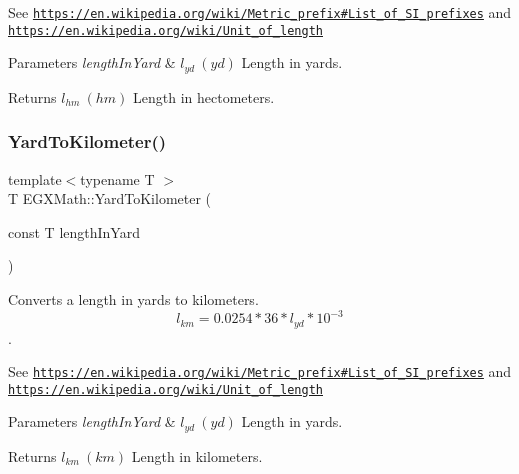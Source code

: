 See \href{https://en.wikipedia.org/wiki/Metric_prefix#List_of_SI_prefixes}{\tt https\+://en.\+wikipedia.\+org/wiki/\+Metric\+\_\+prefix\#\+List\+\_\+of\+\_\+\+S\+I\+\_\+prefixes} and \href{https://en.wikipedia.org/wiki/Unit_of_length}{\tt https\+://en.\+wikipedia.\+org/wiki/\+Unit\+\_\+of\+\_\+length} 
\begin{DoxyParams}{Parameters}
{\em length\+In\+Yard} & $ l_{yd}\ (yd)$ Length in yards. \\
\hline
\end{DoxyParams}
\begin{DoxyReturn}{Returns}
$ l_{hm}\ (hm)$ Length in hectometers. 
\end{DoxyReturn}
\mbox{\label{group___e_g_x_math-_conversions-_length_conversions-_imperial-_yard-_s_i_ga035659a5d1e693eaeda9b012fe59a44f}} 
\subsubsection{\texorpdfstring{Yard\+To\+Kilometer()}{YardToKilometer()}}
{\footnotesize\ttfamily template$<$typename T $>$ \\
T E\+G\+X\+Math\+::\+Yard\+To\+Kilometer (\begin{DoxyParamCaption}\item[{const T}]{length\+In\+Yard }\end{DoxyParamCaption})}



Converts a length in yards to kilometers. \[ l_{km}=0.0254 * 36 * l_{yd} * 10^{-3} \]. 

See \href{https://en.wikipedia.org/wiki/Metric_prefix#List_of_SI_prefixes}{\tt https\+://en.\+wikipedia.\+org/wiki/\+Metric\+\_\+prefix\#\+List\+\_\+of\+\_\+\+S\+I\+\_\+prefixes} and \href{https://en.wikipedia.org/wiki/Unit_of_length}{\tt https\+://en.\+wikipedia.\+org/wiki/\+Unit\+\_\+of\+\_\+length} 
\begin{DoxyParams}{Parameters}
{\em length\+In\+Yard} & $ l_{yd}\ (yd)$ Length in yards. \\
\hline
\end{DoxyParams}
\begin{DoxyReturn}{Returns}
$ l_{km}\ (km)$ Length in kilometers. 
\end{DoxyReturn}
\mbox{\label{group___e_g_x_math-_conversions-_length_conversions-_imperial-_yard-_s_i_ga423d6a2f1a68d54370f3c9967e6c877e}} 
